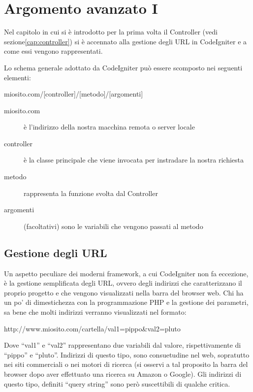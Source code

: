 \chapter{Argomento avanzato I}
\label{cap:url}

Nel capitolo in cui si è introdotto per la prima volta il Controller (vedi sezione\vref{cap:controller}) si è accennato alla gestione degli \ac{URL} in CodeIgniter e a come essi vengono rappresentati.

Lo schema generale adottato da CodeIgniter può essere scomposto nei seguenti elementi:

\begin{code}
miosito.com/[controller]/[metodo]/[argomenti]
\end{code}

\begin{description}
\item [miosito.com] è l'indirizzo della nostra macchina remota o server locale
\item [controller] è la classe principale che viene invocata per instradare la nostra richiesta
\item [metodo] rappresenta la funzione svolta dal Controller 
\item [argomenti] (facoltativi) sono le variabili che vengono passati al metodo
\end{description}

\section{Gestione degli URL}
Un aspetto peculiare dei moderni framework, a cui CodeIgniter non fa eccezione, è la gestione semplificata degli \ac{URL}, ovvero degli indirizzi che caratterizzano il proprio progetto e che vengono visualizzati nella barra del browser web. Chi ha un po' di dimestichezza con la programmazione \ac{PHP} e la gestione dei parametri, sa bene che molti indirizzi verranno visualizzati nel formato:

\begin{code}
http://www.miosito.com/cartella/val1=pippo&val2=pluto
\end{code}

Dove  ``val1'' e ``val2'' rappresentano due variabili dal valore, rispettivamente di ``pippo'' e ``pluto''. Indirizzi di questo tipo, sono consuetudine nel web, sopratutto nei siti commerciali o nei motori di ricerca (si osservi a tal proposito la barra del browser dopo aver effettuato una ricerca su Amazon o Google). Gli indirizzi di questo tipo, definiti ``query string'' sono però suscettibili di qualche critica.

